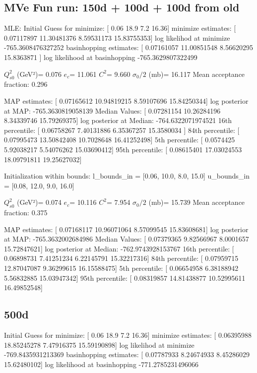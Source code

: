 \documentclass{article}
\begin{document}
\subsection{MVe Fun run: 150d + 100d + 100d from old}

MLE:
Initial Guess for minimize:  [ 0.06 18.9   7.2  16.36]
minimize estimates:  [ 0.07117897 11.30481376  8.59531173 15.83755353]
log likelihod at minimize -765.3608476327252
basinhopping estimates:  [ 0.07161057 11.00851548  8.56620295 15.8363871 ]
log likelihood at basinhopping -765.3629807322499


$Q_{s0}^{2}$ (GeV²)= 0.076
$e_c$= 11.061
$C^{2}$= 9.660
$\sigma_0/2$ (mb)= 16.117
Mean acceptance fraction: 0.296

MAP estimates:  [ 0.07165612 10.94819215  8.59107696 15.84250344]
log posterior at MAP:  -765.3630819058139
Median Values:  [ 0.07281154 10.26284196  8.34339746 15.79269375]
log posterior at Median:  -764.6322071974521
16th percentile:  [ 0.06758267  7.40131886  6.35367257 15.3580034 ]
84th percentile:  [ 0.07995473 13.50842408 10.7028648  16.41252498]
5th percentile:  [ 0.0574425   5.92038217  5.54076262 15.03690412]
95th percentile:  [ 0.08615401 17.03024553 18.09791811 19.25627032]

Initialization within bounds:
l_bounds_in = [0.06, 10.0, 8.0, 15.0]
u_bounds_in = [0.08, 12.0, 9.0, 16.0]

$Q_{s0}^{2}$ (GeV²)= 0.074
$e_c$= 10.116
$C^{2}$= 7.954
$\sigma_0/2$ (mb)= 15.739
Mean acceptance fraction: 0.375

MAP estimates:  [ 0.07168117 10.96071064  8.57099545 15.83608681]
log posterior at MAP:  -765.3632002684986
Median Values:  [ 0.07379365  9.82566967  8.0001657  15.72847621]
log posterior at Median:  -762.9743928153767
16th percentile:  [ 0.06898731  7.41251234  6.22145791 15.32217316]
84th percentile:  [ 0.07959715 12.87047087  9.36299615 16.15588475]
5th percentile:  [ 0.06654958  6.38188942  5.56832885 15.03947342]
95th percentile:  [ 0.08319857 14.81438877 10.52995611 16.49852548]

\subsection{500d}

Initial Guess for minimize:  [ 0.06 18.9   7.2  16.36]
minimize estimates:  [ 0.06395988 18.85245278  7.47916375 15.59190898]
log likelihod at minimize -769.8435931213369
basinhopping estimates:  [ 0.07787933  8.24674933  8.45286029 15.62480102]
log likelihood at basinhopping -771.2785231496066
\end{document}
